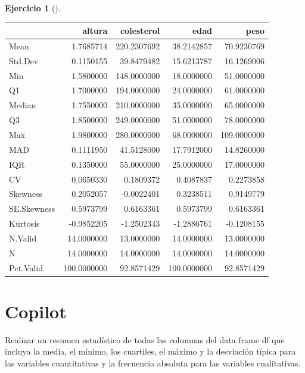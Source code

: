 \documentclass[
  a4paper,
]{scrreport}
\newenvironment{Shaded}{\begin{snugshade}}{\end{snugshade}}
\newcommand{\ExtensionTok}[1]{\textcolor[rgb]{0.00,0.23,0.31}{#1}}
\newcommand{\NormalTok}[1]{\textcolor[rgb]{0.00,0.23,0.31}{#1}}
\theoremstyle{definition}
\newtheorem{exercise}{Ejercicio}[chapter]
\theoremstyle{remark}
\begin{document}
\begin{exercise}[]
\begin{enumerate}
\begin{tcolorbox}
  \begin{longtable}[]{@{}lrrrr@{}}
  \toprule\noalign{}
  & altura & colesterol & edad & peso \\
  \midrule\noalign{}
  \endhead
  \bottomrule\noalign{}
  \endlastfoot
  Mean & 1.7685714 & 220.2307692 & 38.2142857 & 70.9230769 \\
  Std.Dev & 0.1150155 & 39.8479482 & 15.6213787 & 16.1269006 \\
  Min & 1.5800000 & 148.0000000 & 18.0000000 & 51.0000000 \\
  Q1 & 1.7000000 & 194.0000000 & 24.0000000 & 61.0000000 \\
  Median & 1.7550000 & 210.0000000 & 35.0000000 & 65.0000000 \\
  Q3 & 1.8500000 & 249.0000000 & 51.0000000 & 78.0000000 \\
  Max & 1.9800000 & 280.0000000 & 68.0000000 & 109.0000000 \\
  MAD & 0.1111950 & 41.5128000 & 17.7912000 & 14.8260000 \\
  IQR & 0.1350000 & 55.0000000 & 25.0000000 & 17.0000000 \\
  CV & 0.0650330 & 0.1809372 & 0.4087837 & 0.2273858 \\
  Skewness & 0.2052057 & -0.0022401 & 0.3238511 & 0.9149779 \\
  SE.Skewness & 0.5973799 & 0.6163361 & 0.5973799 & 0.6163361 \\
  Kurtosis & -0.9852205 & -1.2502343 & -1.2886761 & -0.1208155 \\
  N.Valid & 14.0000000 & 13.0000000 & 14.0000000 & 13.0000000 \\
  N & 14.0000000 & 14.0000000 & 14.0000000 & 14.0000000 \\
  Pct.Valid & 100.0000000 & 92.8571429 & 100.0000000 & 92.8571429 \\
  \end{longtable}

  \section{Copilot}

\begin{Shaded}
\begin{Highlighting}[]
\ExtensionTok{Realizar}\NormalTok{ un resumen estadístico de todas las columnas del data frame df que incluya la media, el mínimo, los cuartiles, el máximo y la desviación típica para las variables cuantitativas y la frecuencia absoluta para las variables cualitativas.}
\end{Highlighting}
\end{Shaded}


\end{tcolorbox}
\end{enumerate}
\end{exercise}
\end{document}
